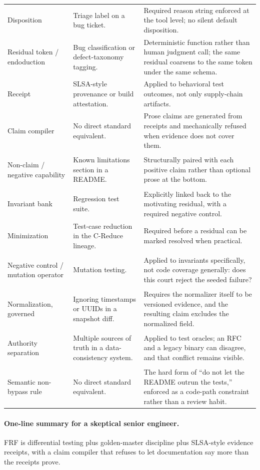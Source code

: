 \documentclass[11pt,a4paper]{article}
\newcommand{\frf}{\textsc{FRF}}
\begin{document}
\begin{center}
\begin{tabularx}{\textwidth}{@{}>{\bfseries\raggedright\arraybackslash}p{}>{\raggedright\arraybackslash}p{}>{\raggedright\arraybackslash}X@{}}
Disposition & Triage label on a bug ticket. & Required reason string enforced at the tool level; no silent default disposition. \\
Residual token / endoduction & Bug classification or defect-taxonomy tagging. & Deterministic function rather than human judgment call; the same residual coarsens to the same token under the same schema. \\
Receipt & SLSA-style provenance or build attestation. & Applied to behavioral test outcomes, not only supply-chain artifacts. \\
Claim compiler & No direct standard equivalent. & Prose claims are generated from receipts and mechanically refused when evidence does not cover them. \\
Non-claim / negative capability & Known limitations section in a README. & Structurally paired with each positive claim rather than optional prose at the bottom. \\
Invariant bank & Regression test suite. & Explicitly linked back to the motivating residual, with a required negative control. \\
Minimization & Test-case reduction in the C-Reduce lineage. & Required before a residual can be marked resolved when practical. \\
Negative control / mutation operator & Mutation testing. & Applied to invariants specifically, not code coverage generally: does this court reject the seeded failure? \\
Normalization, governed & Ignoring timestamps or UUIDs in a snapshot diff. & Requires the normalizer itself to be versioned evidence, and the resulting claim excludes the normalized field. \\
Authority separation & Multiple sources of truth in a data-consistency system. & Applied to test oracles; an RFC and a legacy binary can disagree, and that conflict remains visible. \\
Semantic non-bypass rule & No direct standard equivalent. & The hard form of ``do not let the README outrun the tests,'' enforced as a code-path constraint rather than a review habit. \\
\bottomrule
\end{tabularx}
\endgroup
\end{center}
\clearpage
\restoregeometry

\paragraph{One-line summary for a skeptical senior engineer.}
\frf{} is differential testing plus golden-master discipline plus SLSA-style evidence receipts, with a claim compiler that refuses to let documentation say more than the receipts prove.
\end{document}

